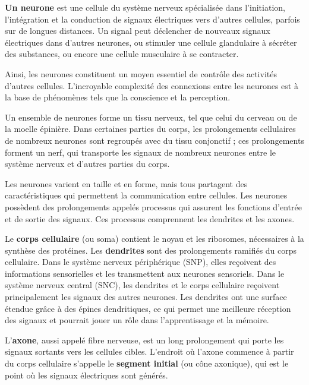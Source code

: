 	\hspace*{1em} \textbf{Un neurone} est une cellule du système nerveux spécialisée dans l'initiation, 
	l'intégration et la conduction de signaux électriques vers d'autres cellules, parfois sur de longues distances. Un signal peut déclencher de nouveaux signaux 
	électriques dans d'autres neurones, ou stimuler une cellule glandulaire à sécréter des substances, ou encore une cellule musculaire à se contracter. 
	
	\hspace*{1em}Ainsi, les neurones constituent un moyen essentiel de contrôle des activités d'autres cellules. L'incroyable complexité des connexions entre les neurones est à la base de phénomènes tels que la conscience et la perception. 
	
	\hspace*{1em}Un ensemble de neurones forme un tissu nerveux, tel que celui du cerveau ou de 
	la moelle épinière. Dans certaines parties du corps, les prolongements cellulaires 
	de nombreux neurones sont regroupés avec du tissu conjonctif ; 
	ces prolongements forment un nerf, qui transporte les signaux de nombreux neurones 
	entre le système nerveux et d'autres parties du corps.	
	   
	\hspace*{1em}Les neurones varient en taille et en forme, mais tous partagent des caractéristiques qui permettent la communication entre cellules. Les neurones possèdent des prolongements appelés processus qui assurent les fonctions d'entrée et de sortie des signaux. Ces processus comprennent les dendrites et les axones.

	\hspace*{1em}Le \textbf{corps cellulaire} (ou soma) contient le noyau et les ribosomes, nécessaires à la synthèse des protéines. Les \textbf{dendrites} sont des prolongements ramifiés du corps cellulaire. Dans le système nerveux périphérique (SNP), elles reçoivent des informations sensorielles et les transmettent aux neurones sensoriels. Dans le système nerveux central (SNC), les dendrites et le corps cellulaire reçoivent principalement les signaux des autres neurones. Les dendrites ont une surface étendue grâce à des épines dendritiques, ce qui permet une meilleure réception des signaux et pourrait jouer un rôle dans l'apprentissage et la mémoire.
	
	\hspace*{1em}L'\textbf{axone}, aussi appelé fibre nerveuse, est un long prolongement qui porte les signaux sortants vers les cellules cibles. L'endroit où l'axone commence à partir du corps cellulaire s'appelle le \textbf{segment initial} (ou cône axonique), qui est le point où les signaux électriques sont générés. 
	
